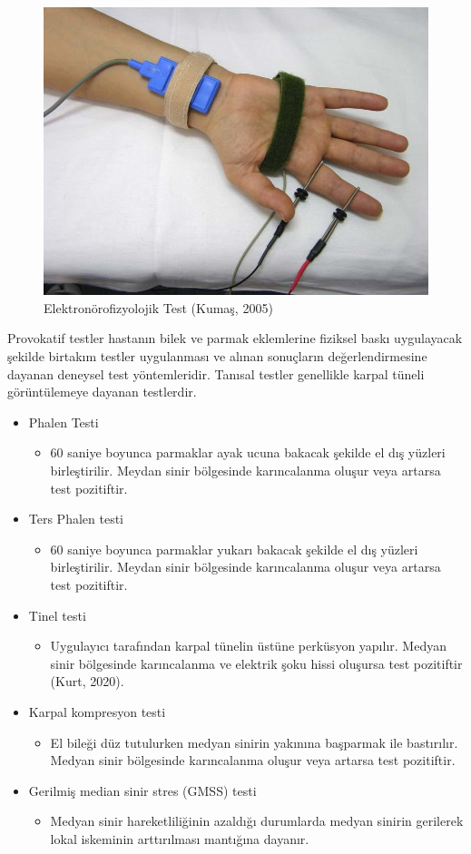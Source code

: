 \documentclass[12pt,twoside]{deuthesis}
\providecommand{\tightlist}{%
  \setlength{\itemsep}{0pt}\setlength{\parskip}{0pt}}
\begin{document}
\begin{figure}

{\centering \includegraphics[width=0.49\linewidth,height=0.18\textheight]{figure/noropati_test} 

}

\caption{Elektronörofizyolojik Test (Kumaş, 2005)}\label{fig:unnamed-chunk-2}
\end{figure}
Provokatif testler hastanın bilek ve parmak eklemlerine fiziksel baskı uygulayacak şekilde birtakım
testler uygulanması ve alınan sonuçların değerlendirmesine dayanan deneysel test yöntemleridir.
Tanısal testler genellikle karpal tüneli görüntülemeye dayanan testlerdir.
\begin{itemize}
\item
  Phalen Testi
  \begin{itemize}
  \tightlist
  \item
    60 saniye boyunca parmaklar ayak ucuna bakacak şekilde el dış yüzleri birleştirilir. Meydan sinir bölgesinde karıncalanma oluşur veya artarsa test pozitiftir.
  \end{itemize}
\item
  Ters Phalen testi
  \begin{itemize}
  \tightlist
  \item
    60 saniye boyunca parmaklar yukarı bakacak şekilde el dış yüzleri birleştirilir. Meydan sinir bölgesinde karıncalanma oluşur veya artarsa test pozitiftir.
  \end{itemize}
\item
  Tinel testi
  \begin{itemize}
  \tightlist
  \item
    Uygulayıcı tarafından karpal tünelin üstüne perküsyon yapılır. Medyan sinir bölgesinde karıncalanma ve elektrik şoku hissi oluşursa test pozitiftir (Kurt, 2020).
  \end{itemize}
\item
  Karpal kompresyon testi
  \begin{itemize}
  \tightlist
  \item
    El bileği düz tutulurken medyan sinirin yakınına başparmak ile bastırılır. Medyan sinir bölgesinde karıncalanma oluşur veya artarsa test pozitiftir.
  \end{itemize}
\item
  Gerilmiş median sinir stres (GMSS) testi
  \begin{itemize}
  \tightlist
  \item
    Medyan sinir hareketliliğinin azaldığı durumlarda medyan sinirin gerilerek lokal iskeminin arttırılması mantığına dayanır.
  \end{itemize}
\end{itemize}
\end{document}
